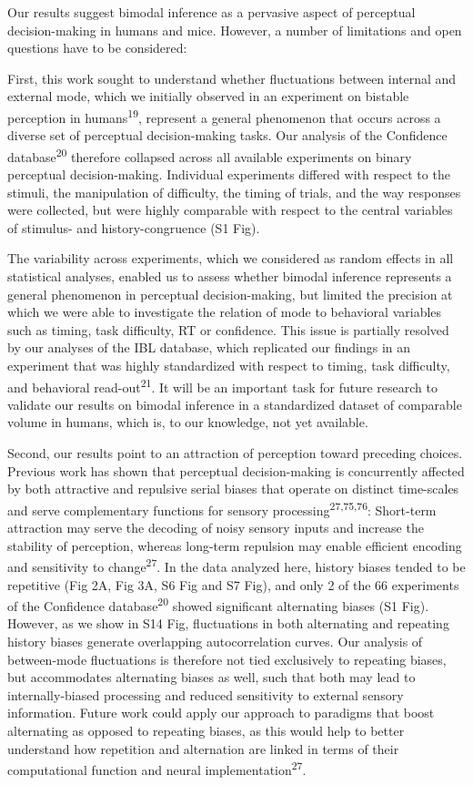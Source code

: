 \documentclass[
]{article}
\begin{document}
Our results suggest bimodal inference as a pervasive aspect of
perceptual decision-making in humans and mice. However, a number of
limitations and open questions have to be considered:

First, this work sought to understand whether fluctuations between
internal and external mode, which we initially observed in an experiment
on bistable perception in humans\textsuperscript{19}, represent a
general phenomenon that occurs across a diverse set of perceptual
decision-making tasks. Our analysis of the Confidence
database\textsuperscript{20} therefore collapsed across all available
experiments on binary perceptual decision-making. Individual experiments
differed with respect to the stimuli, the manipulation of difficulty,
the timing of trials, and the way responses were collected, but were
highly comparable with respect to the central variables of stimulus- and
history-congruence (S1 Fig).

The variability across experiments, which we considered as random
effects in all statistical analyses, enabled us to assess whether
bimodal inference represents a general phenomenon in perceptual
decision-making, but limited the precision at which we were able to
investigate the relation of mode to behavioral variables such as timing,
task difficulty, RT or confidence. This issue is partially resolved by
our analyses of the IBL database, which replicated our findings in an
experiment that was highly standardized with respect to timing, task
difficulty, and behavioral read-out\textsuperscript{21}. It will be an
important task for future research to validate our results on bimodal
inference in a standardized dataset of comparable volume in humans,
which is, to our knowledge, not yet available.

Second, our results point to an attraction of perception toward
preceding choices. Previous work has shown that perceptual
decision-making is concurrently affected by both attractive and
repulsive serial biases that operate on distinct time-scales and serve
complementary functions for sensory
processing\textsuperscript{27,75,76}: Short-term attraction may serve
the decoding of noisy sensory inputs and increase the stability of
perception, whereas long-term repulsion may enable efficient encoding
and sensitivity to change\textsuperscript{27}. In the data analyzed
here, history biases tended to be repetitive (Fig 2A, Fig 3A,
S6 Fig and S7 Fig), and only 2 of the 66 experiments of the
Confidence database\textsuperscript{20} showed significant alternating
biases (S1 Fig). However, as we show in S14
Fig, fluctuations in both alternating and repeating history
biases generate overlapping autocorrelation curves. Our analysis of
between-mode fluctuations is therefore not tied exclusively to repeating
biases, but accommodates alternating biases as well, such that both may
lead to internally-biased processing and reduced sensitivity to external
sensory information. Future work could apply our approach to paradigms
that boost alternating as opposed to repeating biases, as this would
help to better understand how repetition and alternation are linked in
terms of their computational function and neural
implementation\textsuperscript{27}.
\end{document}
